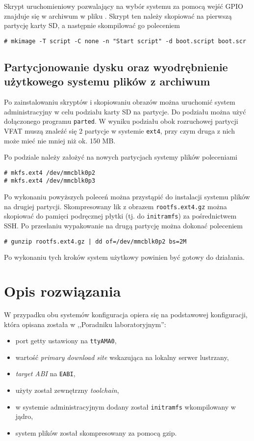 \documentclass[10pt,a4paper]{article}
\begin{document}
Skrypt uruchomieniowy pozwalający na wybór systemu za pomocą wejść GPIO znajduje się
w archiwum w pliku . Skrypt ten należy skopiować na pierwszą
partycję karty SD, a następnie skompilować go poleceniem
\begin{lstlisting}
# mkimage -T script -C none -n "Start script" -d boot.script boot.scr
\end{lstlisting}

\subsection{Partycjonowanie dysku oraz wyodrębnienie użytkowego systemu plików z archiwum}

Po zainstalowaniu skryptów i skopiowaniu obrazów można uruchomić system administracyjny w celu
podziału karty SD na partycje. Do podziału można użyć dołączonego programu \texttt{parted}.
W wyniku podziału obok rozruchowej partycji VFAT muszą znaleźć się 2 partycje w systemie
\texttt{ext4}, przy czym druga z nich może mieć nie mniej niż ok. 150 MB.

Po podziale należy założyć na nowych partycjach systemy plików poleceniami
\begin{lstlisting}
# mkfs.ext4 /dev/mmcblk0p2
# mkfs.ext4 /dev/mmcblk0p3
\end{lstlisting}
Po wykonaniu powyższych poleceń można przystąpić do instalacji systemu plików na drugiej
partycji. Skompresowany lik z obrazem \texttt{rootfs.ext4.gz} można skopiować do pamięci
podręcznej płytki (tj. do \texttt{initramfs}) za pośrednictwem SSH. Po przesłaniu wypakowanie
na drugą partycję można dokonać poleceniem
\begin{lstlisting}
# gunzip rootfs.ext4.gz | dd of=/dev/mmcblk0p2 bs=2M
\end{lstlisting}
Po wykonaniu tych kroków system użytkowy powinien być gotowy do działania.

\section{Opis rozwiązania}

W przypadku obu systemów konfiguracja opiera się na podstawowej konfiguracji, która opisana
została w ,,Poradniku laboratoryjnym'':
\begin{itemize}
	\item port getty ustawiony na \texttt{ttyAMA0},
	\item wartość \emph{primary download site} wskazująca na lokalny serwer lustrzany,
	\item \emph{target ABI} na \texttt{EABI},
	\item użyty został zewnętrzny \emph{toolchain},
	\item w systemie administracyjnym dodany został \texttt{initramfs} wkompilowany
		w jądro,
	\item system plików został skompresowany za pomocą gzip.
\end{itemize}
\end{document}

